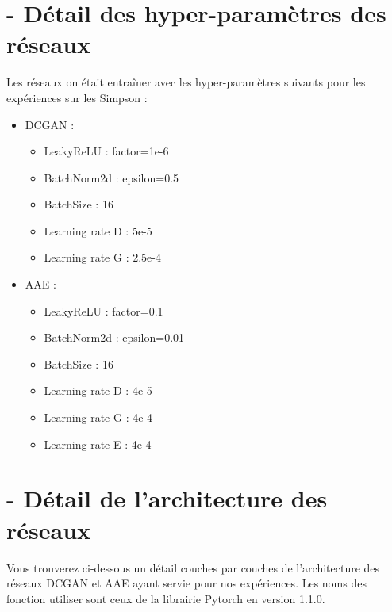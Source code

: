 \documentclass[11pt,francais]{article}
\begin{document}
\begin{appendix}
\section{-  Détail des hyper-paramètres des réseaux}
\label{appendix:annexe2}
Les réseaux on était entraîner avec les hyper-paramètres suivants pour les expériences sur les Simpson :
\begin{itemize}
  \item DCGAN :
  \begin{itemize}
    \item LeakyReLU : factor=1e-6
    \item BatchNorm2d : epsilon=0.5
    \item BatchSize : 16
    \item Learning rate D : 5e-5 
    \item Learning rate G : 2.5e-4
  \end{itemize}
  
  \item AAE :
  \begin{itemize}
    \item LeakyReLU : factor=0.1
    \item BatchNorm2d : epsilon=0.01
    \item BatchSize : 16
    \item Learning rate D : 4e-5 
    \item Learning rate G : 4e-4
    \item Learning rate E : 4e-4
  \end{itemize}
\end{itemize}

\section{-  Détail de l'architecture des réseaux}
\label{appendix:annexe3}
Vous trouverez ci-dessous un détail couches par couches de l'architecture des réseaux DCGAN et AAE ayant servie pour nos expériences.
Les noms des fonction utiliser sont ceux de la librairie Pytorch en version 1.1.0.


\end{appendix}
\end{document}
